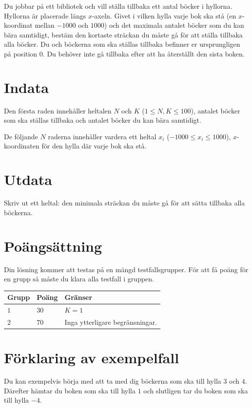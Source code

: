 Du jobbar på ett bibliotek och vill ställa tillbaka ett antal böcker i hyllorna.
Hyllorna är placerade längs $x$-axeln.
Givet i vilken hylla varje bok ska stå (en $x$-koordinat mellan $-1000$ och $1000$) och det maximala antalet böcker som du kan bära samtidigt, bestäm den kortaste sträckan du måste gå för att ställa tillbaka alla böcker.
Du och böckerna som ska ställas tillbaka befinner er ursprungligen på position $0$.
Du behöver inte gå tillbaka efter att ha återställt den sista boken. 

\section*{Indata}
Den första raden innehåller heltalen $N$ och $K$ ($1 \leq N, K \leq 100$),
antalet böcker som ska ställas tillbaka och antalet böcker du kan bära samtidigt.

De följande $N$ raderna innehåller vardera ett heltal $x_i$ ($-1000 \leq x_i \leq 1000$),
$x$-koordinaten för den hylla där varje bok ska stå. 

\section*{Utdata}
Skriv ut ett heltal: den minimala sträckan du måste gå för att sätta tillbaka alla böckerna. 

\section*{Poängsättning}
Din lösning kommer att testas på en mängd testfallsgrupper.
För att få poäng för en grupp så måste du klara alla testfall i gruppen.

\noindent
\begin{tabular}{| l | l | p{12cm} |}
  \hline
  \textbf{Grupp} & \textbf{Poäng} & \textbf{Gränser} \\ \hline
  $1$    & $30$        & $K = 1$ \\ \hline 
  $2$    & $70$        & Inga ytterligare begränsningar. \\ \hline
\end{tabular}

\section*{Förklaring av exempelfall}
Du kan exempelvis börja med att ta med dig böckerna som ska till hylla $3$ och $4$.
Därefter hämtar du boken som ska till hylla $1$ och slutligen tar du boken som ska till hylla $-4$.
